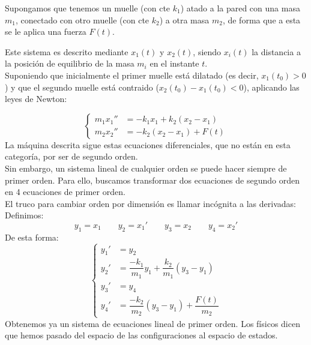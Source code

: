 \begin{ejemplo}
    Supongamos que tenemos un muelle (con cte $k_1$) atado a la pared con una masa $m_1$, conectado con otro muelle (con cte $k_2$) a otra masa $m_2$, de forma que a esta se le aplica una fuerza $F(t)$. %

    Este sistema es descrito mediante $x_1(t)$ y $x_2(t)$, siendo $x_i(t)$ la distancia a la posición de equilibrio de la masa $m_i$ en el instante $t$.\\

    Suponiendo que inicialmente el primer muelle está dilatado (es decir, $x_1(t_0) > 0$) y que el segundo muelle está contraido ($x_2(t_0) - x_1(t_0)<0$), aplicando las leyes de Newton:

    \begin{equation*}
        \left\{\begin{array}{rl}
                m_1 x_1 '' &= -k_1 x_1 + k_2 (x_2 - x_1) \\
                m_2 x_2 '' &= -k_2(x_2 - x_1) + F(t)
        \end{array}\right.
    \end{equation*}
    La máquina descrita sigue estas ecuaciones diferenciales, que no están en esta categoría, por ser de segundo orden.\\

    Sin embargo, un sistema lineal de cualquier orden se puede hacer siempre de primer orden. Para ello, buscamos transformar dos ecuaciones de segundo orden en 4 ecuaciones de primer orden.\\

    El truco para cambiar orden por dimensión es llamar incógnita a las derivadas:\\
    Definimos:
    \begin{equation*}
        y_1 = x_1 \qquad y_2 = x_1' \qquad y_3 = x_2 \qquad y_4 = x_2'
    \end{equation*}
    De esta forma:
    \begin{equation*}
        \left\{\begin{array}{rl}
                y_1' &= y_2 \\
            y_2' &= \dfrac{-k_1}{m_1} y_1 + \dfrac{k_2}{m_1} (y_3-y_1) \\
            y_3' &= y_4 \\
            y_4' &= \dfrac{-k_2}{m_2}(y_3-y_1) + \dfrac{F(t)}{m_2}
        \end{array}\right.
    \end{equation*}
    Obtenemos ya un sistema de ecuaciones lineal de primer orden. Los físicos dicen que hemos pasado del espacio de las configuraciones al espacio de estados.\\


\end{ejemplo}
